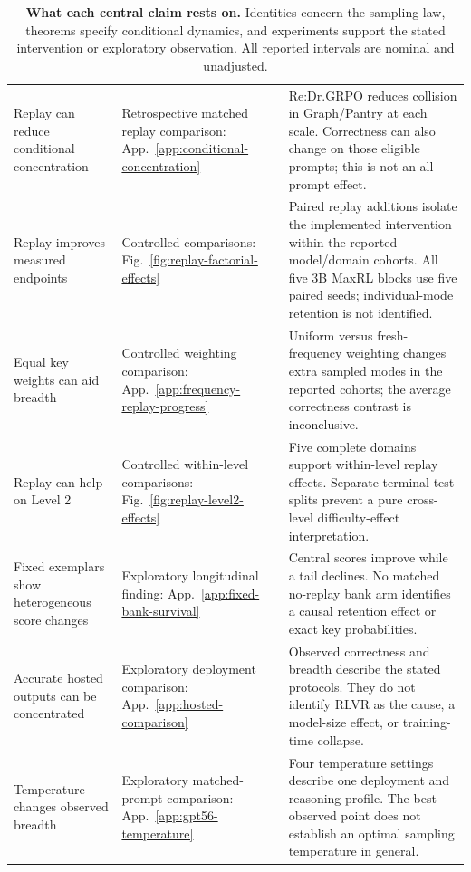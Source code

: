 \documentclass{article}
\newcommand{\1}{\mathbf 1}
\theoremstyle{remark}
\theoremstyle{definition}
\theoremstyle{plain}
\begin{document}
\begin{table}[H]
\begin{tabularx}{\linewidth}{@{}p{.21\linewidth}p{.22\linewidth}X@{}}
Replay can reduce conditional concentration & Retrospective matched replay comparison:
App.~\ref{app:conditional-concentration} &
Re:Dr.GRPO reduces collision in Graph/Pantry at each scale. Correctness
can also change on those eligible prompts; this is not an all-prompt effect. \\
Replay improves measured endpoints & Controlled comparisons:
Fig.~\ref{fig:replay-factorial-effects} &
Paired replay additions isolate the implemented intervention within the
reported model/domain cohorts. All five 3B MaxRL blocks use five paired
seeds; individual-mode retention is not identified. \\
Equal key weights can aid breadth & Controlled weighting comparison:
App.~\ref{app:frequency-replay-progress} &
Uniform versus fresh-frequency weighting changes extra sampled modes in the
reported cohorts; the average correctness contrast is inconclusive. \\
Replay can help on Level 2 & Controlled within-level comparisons:
Fig.~\ref{fig:replay-level2-effects} &
Five complete domains support within-level replay effects. Separate terminal
test splits prevent a pure cross-level difficulty-effect interpretation. \\
Fixed exemplars show heterogeneous score changes & Exploratory longitudinal finding:
App.~\ref{app:fixed-bank-survival} &
Central scores improve while a tail declines. No matched no-replay bank arm
identifies a causal retention effect or exact key probabilities. \\
Accurate hosted outputs can be concentrated & Exploratory deployment comparison:
App.~\ref{app:hosted-comparison} &
Observed correctness and breadth describe the stated protocols. They do not
identify RLVR as the cause, a model-size effect, or training-time collapse. \\
Temperature changes observed breadth & Exploratory matched-prompt comparison:
App.~\ref{app:gpt56-temperature} &
Four temperature settings describe one deployment and reasoning profile.
The best observed point does not establish an optimal sampling temperature in general. \\
\bottomrule
\end{tabularx}
\caption{\textbf{What each central claim rests on.} Identities concern the
sampling law, theorems specify conditional dynamics, and experiments support
the stated intervention or exploratory observation. All reported intervals
are nominal and unadjusted.}
\label{tab:claim-basis}
\end{table}
\end{document}

